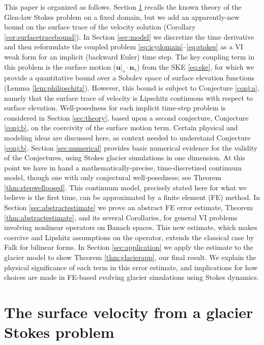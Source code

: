 \documentclass[hidelinks,onefignum,onetabnum,final]{siamart220329}  %
\newcommand{\bn}{\mathbf{n}}
\newcommand{\bu}{\mathbf{u}}
\begin{document}
This paper is organized as follows.  Section \ref{sec:stokes} recalls the known theory of the Glen-law Stokes problem on a fixed domain, but we add an apparently-new bound on the surface trace of the velocity solution (Corollary \ref{cor:surfacetracebound}).  In Section \ref{sec:model} we discretize the time derivative and then reformulate the coupled problem \eqref{eq:icydomain}--\eqref{eq:stokes} as a VI weak form for an implicit (backward Euler) time step.  The key coupling term in this problem is the surface motion ($\bu|_s\cdot \bn_s$) from the SKE \eqref{eq:ske}, for which we provide a quantitative bound over a Sobolev space of surface elevation functions (Lemma \ref{lem:philipschitz}).  However, this bound is subject to Conjecture \ref{conj:a}, namely that the surface trace of velocity is Lipschitz continuous with respect to surface elevation.  Well-posedness for each implicit time-step problem is considered in Section \ref{sec:theory}, based upon a second conjecture, Conjecture \ref{conj:b}, on the coercivity of the surface motion term.  Certain physical and modeling ideas are discussed here, as context needed to understand Conjecture \ref{conj:b}.  Section \ref{sec:numerical} provides basic numerical evidence for the validity of the Conjectures, using Stokes glacier simulations in one dimension.  At this point we have in hand a mathematically-precise, time-discretized continuum model, though one with only conjectural well-posedness; see Theorem \ref{thm:stepwellposed}.  This continuum model, precisely stated here for what we believe is the first time, can be approximated by a finite element (FE) method.  In Section \ref{sec:abstractestimate} we prove an abstract FE error estimate, Theorem \ref{thm:abstractestimate}, and its several Corollaries, for general VI problems involving nonlinear operators on Banach spaces.  This new estimate, which makes coercive and Lipshitz assumptions on the operator, extends the classical case by Falk \cite{Falk1974} for bilinear forms.  In Section \ref{sec:application} we apply the estimate to the glacier model to show Theorem \ref{thm:glacierapp}, our final result.  We explain the physical significance of each term in this error estimate, and implications for how choices are made in FE-based evolving glacier simulations using Stokes dynamics.


\section{The surface velocity from a glacier Stokes problem} \label{sec:stokes}
\end{document}
